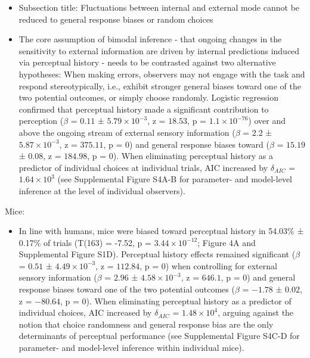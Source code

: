 \documentclass[
]{article}
\providecommand{\tightlist}{%
  \setlength{\itemsep}{0pt}\setlength{\parskip}{0pt}}
\begin{document}
\begin{itemize}
\item
  Subsection title: Fluctuations between internal and external mode
  cannot be reduced to general response biases or random choices
\item
  The core assumption of bimodal inference - that ongoing changes in the
  sensitivity to external information are driven by internal predictions
  induced via perceptual history - needs to be contrasted against two
  alternative hypotheses: When making errors, observers may not engage
  with the task and respond stereotypically, i.e., exhibit stronger
  general biases toward one of the two potential outcomes, or simply
  choose randomly. Logistic regression confirmed that perceptual history
  made a significant contribution to perception (\(\beta\) = \(0.11\) ±
  \(\ensuremath{5.79\times 10^{-3}}\), z = \(18.53\), p =
  \(\ensuremath{1.1\times 10^{-76}}\)) over and above the ongoing stream
  of external sensory information (\(\beta\) = \(2.2\) ±
  \(\ensuremath{5.87\times 10^{-3}}\), z = \(375.11\), p = \(0\)) and
  general response biases toward (\(\beta\) = \(15.19\) ± \(0.08\), z =
  \(184.98\), p = \(0\)). When eliminating perceptual history as a
  predictor of individual choices at individual trials, AIC increased by
  \(\delta_{AIC}\) = \(\ensuremath{1.64\times 10^{3}}\) (see
  Supplemental Figure S4A-B for parameter- and model-level inference at
  the level of individual observers).
\end{itemize}

Mice:

\begin{itemize}
\tightlist
\item
  In line with humans, mice were biased toward perceptual history in
  54.03\% ± 0.17\% of trials (T(163) = -7.52, p =
  \(\ensuremath{3.44\times 10^{-12}}\); Figure 4A and Supplemental
  Figure S1D). Perceptual history effects remained significant
  (\(\beta\) = \(0.51\) ± \(\ensuremath{4.49\times 10^{-3}}\), z =
  \(112.84\), p = \(0\)) when controlling for external sensory
  information (\(\beta\) = \(2.96\) ±
  \(\ensuremath{4.58\times 10^{-3}}\), z = \(646.1\), p = \(0\)) and
  general response biases toward one of the two potential outcomes
  (\(\beta\) = \(-1.78\) ± \(0.02\), z = \(-80.64\), p = \(0\)). When
  eliminating perceptual history as a predictor of individual choices,
  AIC increased by \(\delta_{AIC}\) =
  \(\ensuremath{1.48\times 10^{4}}\), arguing against the notion that
  choice randomness and general response bias are the only determinants
  of perceptual performance (see Supplemental Figure S4C-D for
  parameter- and model-level inference within individual mice).
\end{itemize}
\end{document}
